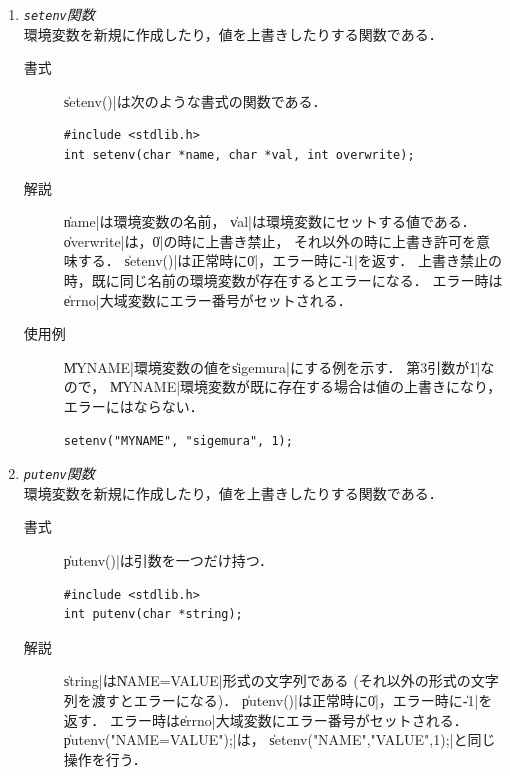 \begin{enumerate}
\item \emph{\texttt{setenv}関数} \\
  環境変数を新規に作成したり，値を上書きしたりする関数である．

  \begin{description}
  \item [書式] \|setenv()|は次のような書式の関数である．

\begin{lstlisting}[numbers=none]
#include <stdlib.h>
int setenv(char *name, char *val, int overwrite);
\end{lstlisting}

  \item [解説]
    \|name|は環境変数の名前，
    \|val|は環境変数にセットする値である．
    \|overwrite|は，\|0|の時に上書き禁止，
    それ以外の時に上書き許可を意味する．
    \|setenv()|は正常時に\|0|，エラー時に\|-1|を返す．
    上書き禁止の時，既に同じ名前の環境変数が存在するとエラーになる．
    エラー時は\|errno|大域変数にエラー番号がセットされる．

  \item [使用例] \|MYNAME|環境変数の値を\|sigemura|にする例を示す．
    第3引数が\|1|なので，
    \|MYNAME|環境変数が既に存在する場合は値の上書きになり，
    エラーにはならない．

\begin{lstlisting}[numbers=none]
setenv("MYNAME", "sigemura", 1);
\end{lstlisting}
  \end{description}

\item \emph{\texttt{putenv}関数} \\
  環境変数を新規に作成したり，値を上書きしたりする関数である．

  \begin{description}
  \item [書式] \|putenv()|は引数を一つだけ持つ．

\begin{lstlisting}[numbers=none]
#include <stdlib.h>
int putenv(char *string);
\end{lstlisting}

  \item [解説]
    \|string|は\|NAME=VALUE|形式の文字列である
    (それ以外の形式の文字列を渡すとエラーになる)．
    \|putenv()|は正常時に\|0|，エラー時に\|-1|を返す．
    エラー時は\|errno|大域変数にエラー番号がセットされる．
    \|putenv("NAME=VALUE");|は，
    \|setenv("NAME","VALUE",1);|と同じ操作を行う．


\end{description}
\end{enumerate}
